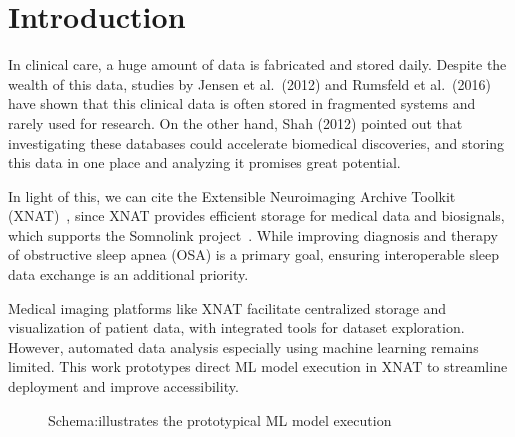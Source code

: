 

\section{Introduction}

In clinical care, a huge amount of data is fabricated and stored daily. Despite the wealth of this data, studies by Jensen et al.~(2012) and Rumsfeld et al.~(2016) have shown that this clinical data is often stored in fragmented systems and rarely used for research. On the other hand, Shah (2012)\cite{jensen_mining_2012,rumsfeld_big_2016,shah_coming_2012} pointed out that investigating these databases could accelerate biomedical discoveries, and storing this data in one place and analyzing it promises great potential.

In light of this, we can cite the Extensible Neuroimaging Archive Toolkit (XNAT)~\cite{marcus_extensible_2007}, since XNAT provides efficient storage for medical data and biosignals, which supports the Somnolink project~\cite{internetredaktion_somnolink_nodate}. While improving diagnosis and therapy of obstructive sleep apnea (OSA) is a primary goal, ensuring interoperable sleep data exchange is an additional priority.

Medical imaging platforms like XNAT facilitate centralized storage and visualization of patient data, with integrated tools for dataset exploration. However, automated data analysis especially using machine learning remains limited. This work prototypes direct ML model execution in XNAT to streamline deployment and improve accessibility.






\begin{figure}[ht]
  \centering
  \def\svgwidth{0.8\linewidth}
  
  \caption{Schema:illustrates the prototypical ML model execution }
  \label{fig:diagram-core-libraries}
\end{figure}


















 


